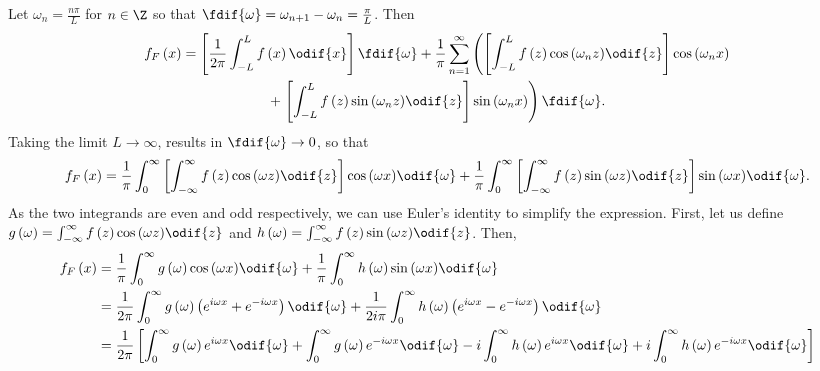 \documentclass{article}
\begin{document}
Let \(\omega_n = \frac{n \pi}{L}\) for \(n \in \Z\) so that
\(\fdif{\omega} = \omega_{n + 1} - \omega_n = \frac{\pi}{L}\). Then
\begin{multline*}
    f_F\left( x \right) = \left[ \frac{1}{2\pi} \int_{-L}^L f\left( x \right) \odif{x} \right] \fdif{\omega}
    + \frac{1}{\pi} \sum_{n = 1}^\infty
    \left( \left[ \int_{-L}^L f\left( z \right) \cos{\left( \omega_n z \right)} \odif{z} \right] \cos{\left( \omega_n x \right)} \right. \\
    + \left. \left[ \int_{-L}^L f\left( z \right) \sin{\left( \omega_n z \right)} \odif{z} \right] \sin{\left( \omega_n x \right)} \right) \fdif{\omega}.
\end{multline*}
Taking the limit \(L \to \infty\), results in \(\fdif{\omega} \to 0\), so that
\begin{equation*}
    f_F\left( x \right) = \frac{1}{\pi} \int_0^\infty \left[ \int_{-\infty}^\infty f\left( z \right) \cos{\left( \omega z \right)} \odif{z} \right] \cos{\left( \omega x \right)} \odif{\omega} + \frac{1}{\pi} \int_0^\infty \left[ \int_{-\infty}^\infty f\left( z \right) \sin{\left( \omega z \right)} \odif{z} \right] \sin{\left( \omega x \right)} \odif{\omega}.
\end{equation*}
As the two integrands are even and odd respectively, we can use Euler's
identity to simplify the expression. First, let us define
\(g\left( \omega \right) = \int_{-\infty}^\infty f\left( z \right) \cos{\left( \omega z \right)} \odif{z}\)
and \(h\left( \omega \right) = \int_{-\infty}^\infty f\left( z \right) \sin{\left( \omega z \right)} \odif{z}\).
Then,
\begin{align*}
    f_F\left( x \right) & = \frac{1}{\pi} \int_0^\infty g\left( \omega \right) \cos{\left( \omega x \right)} \odif{\omega} + \frac{1}{\pi} \int_0^\infty h\left( \omega \right) \sin{\left( \omega x \right)} \odif{\omega}                                                                                                                    \\
                        & = \frac{1}{2 \pi} \int_0^\infty g\left( \omega \right) \left( e^{i \omega x} + e^{-i \omega x} \right) \odif{\omega} + \frac{1}{2i \pi} \int_0^\infty h\left( \omega \right) \left( e^{i \omega x} - e^{-i \omega x} \right) \odif{\omega}                                                                           \\
                        & = \frac{1}{2 \pi} \left[ \int_0^\infty g\left( \omega \right) e^{i \omega x} \odif{\omega} + \int_0^\infty g\left( \omega \right) e^{-i \omega x} \odif{\omega} - i \int_0^\infty h\left( \omega \right) e^{i \omega x} \odif{\omega} + i \int_0^\infty h\left( \omega \right) e^{-i \omega x} \odif{\omega} \right]
\end{align*}
\end{document}
